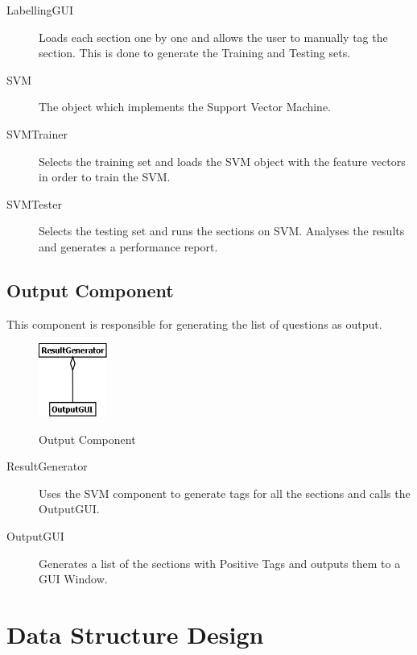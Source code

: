 \documentclass[10pt,a4paper]{report}
\begin{document}
\begin{description}
	\item[LabellingGUI] Loads each section one by one and allows the user to manually tag the section. This is done to generate the Training and Testing sets.
	\item[SVM] The object which implements the Support Vector Machine.
	\item[SVMTrainer] Selects the training set and loads the SVM object with the feature vectors in order to train the SVM.
	\item[SVMTester] Selects the testing set and runs the sections on SVM. Analyses the results and generates a performance report.
\end{description}

\clearpage


\subsection{Output Component}

This component is responsible for generating the list of questions as output. \\

\begin{figure}[h!]
\centering
\includegraphics[width=0.20\textwidth]{./diagrams/Output}\\
\caption{Output Component}
\end{figure}

\begin{description}
	\item[ResultGenerator] Uses the SVM component to generate tags for all the sections and calls the OutputGUI.
	\item[OutputGUI] Generates a list of the sections with Positive Tags and outputs them to a GUI Window.
\end{description}

\clearpage


\section{Data Structure Design}
\end{document}
